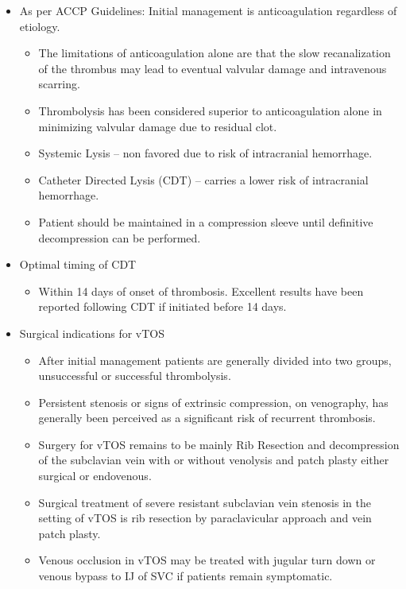 \documentclass[
]{book}
\providecommand{\tightlist}{%
  \setlength{\itemsep}{0pt}\setlength{\parskip}{0pt}}
\begin{document}
\begin{itemize}
\item
  As per ACCP Guidelines: Initial management is anticoagulation
  regardless of etiology. \citep{kearonAntithromboticTherapyVTE2016}

  \begin{itemize}
  \item
    The limitations of anticoagulation alone are that the slow
    recanalization of the thrombus may lead to eventual valvular
    damage and intravenous scarring.
    \citep{sekharYearbookVascularEndovascular2018}
  \item
    Thrombolysis has been considered superior to anticoagulation
    alone in minimizing valvular damage due to residual clot.
    \citep{urschelSurgeryRemainsMost2008}
  \item
    Systemic Lysis -- non favored due to risk of intracranial
    hemorrhage. \citep{grunwaldCatheterDirectedThrombolysisTreatment2004}
  \item
    Catheter Directed Lysis (CDT) -- carries a lower risk of
    intracranial hemorrhage.
  \item
    Patient should be maintained in a compression sleeve until
    definitive decompression can be performed.
  \end{itemize}
\item
  Optimal timing of CDT

  \begin{itemize}
  \tightlist
  \item
    Within 14 days of onset of thrombosis. Excellent results have
    been reported following CDT if initiated before 14 days.
    \citep{wilsonFibrinolyticTherapyIdiopathic1990}
  \end{itemize}
\item
  Surgical indications for vTOS

  \begin{itemize}
  \item
    After initial management patients are generally divided into two
    groups, unsuccessful or successful thrombolysis.
  \item
    Persistent stenosis or signs of extrinsic compression, on
    venography, has generally been perceived as a significant risk
    of recurrent thrombosis.
  \item
    Surgery for vTOS remains to be mainly Rib Resection and
    decompression of the subclavian vein with or without venolysis
    and patch plasty either surgical or endovenous.
  \item
    Surgical treatment of severe resistant subclavian vein stenosis
    in the setting of vTOS is rib resection by paraclavicular
    approach and vein patch plasty.
    \citep{melbyComprehensiveSurgicalManagement2008}
  \item
    Venous occlusion in vTOS may be treated with jugular turn down
    or venous bypass to IJ of SVC if patients remain symptomatic.
    \citep{vemuriDiagnosisTreatmentEffortinduced2016}
  \end{itemize}
\end{itemize}
\end{document}
